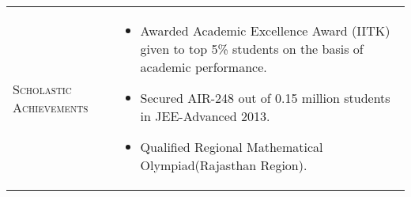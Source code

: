 \documentclass[a4paper]{article}
\begin{document}
\vspace{-2em}
\centering
\begin{longtable}{@{}m{3.0cm}m{14cm}@{}}

  \textrm{\textsc {Scholastic Achievements}} & 
                                               \begin{itemize} \itemsep -2pt
                                               \item
                                                 Awarded Academic Excellence Award (IITK) given to top 5\% students on the basis of academic performance.
                                               \item
                                                 Secured AIR-248 out of 0.15 million students in JEE-Advanced 2013.
                                               \item
                                                 Qualified Regional Mathematical Olympiad(Rajasthan Region).
                                               \end{itemize}

\\


\end{longtable}
\end{document}
